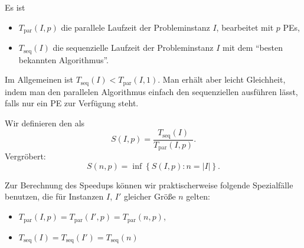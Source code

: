 Es ist
\begin{itemize}
  \item \( T_\text{par}(I,p) \) die parallele Laufzeit der Probleminstanz \( I \), bearbeitet mit \( p \) PEs,
  \item \( T_\text{seq}(I) \) die sequenzielle Laufzeit der Probleminstanz \( I \) mit dem ``besten bekannten Algorithmus''.
\end{itemize}

Im Allgemeinen ist \( T_\text{seq}(I) < T_\text{par}(I,1) \). Man erhält aber leicht Gleichheit, indem man den parallelen Algorithmus einfach den sequenziellen ausführen lässt, falls nur ein PE zur Verfügung steht.

\begin{definition}[Speedup]
  Wir definieren den  als
  \begin{equation*}
    S(I,p) = \frac{T_\text{seq}(I)}{T_\text{par}(I,p)}\text{.}
  \end{equation*}
  Vergröbert:
  \begin{equation*}
    S(n,p) = \inf\left \{ S(I,p) : n = \left\vert I \right\vert \right \}\text{.}
  \end{equation*}
\end{definition}

Zur Berechnung des Speedups können wir praktischerweise folgende Spezialfälle benutzen, die für Instanzen \( I \), \( I' \) gleicher Größe \( n \) gelten:
\begin{itemize}
  \item \( T_\text{par}(I,p) = T_\text{par}(I',p) = T_\text{par}(n,p) \),
  \item \( T_\text{seq}(I) = T_\text{seq}(I') = T_\text{seq}(n) \)
\end{itemize}
